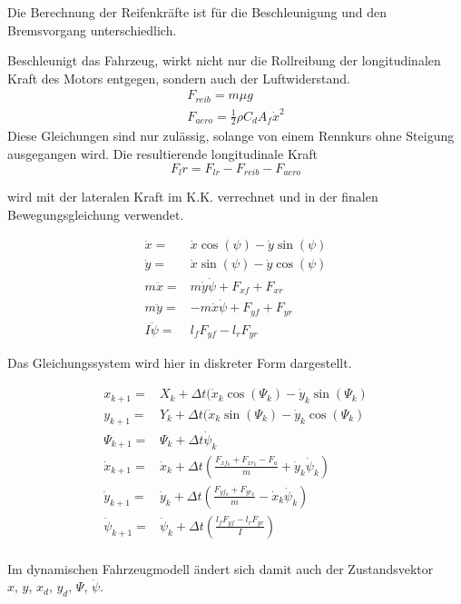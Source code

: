 \documentclass{like}
\begin{document}
Die Berechnung der Reifenkräfte ist für die Beschleunigung und den Bremsvorgang unterschiedlich.

Beschleunigt das Fahrzeug, wirkt nicht nur die Rollreibung der longitudinalen Kraft des Motors entgegen, sondern auch der Luftwiderstand.
\begin{eqnarray}
F_{reib} = m \mu g \\
F_{aero} = \frac{1}{2} \rho C_d A_f \dot{x}^2
\end{eqnarray}
Diese Gleichungen sind nur zulässig, solange von einem Rennkurs ohne Steigung ausgegangen wird. Die resultierende longitudinale Kraft 
\begin{equation}
F_lr = F_{lr} - F_{reib} - F_{aero}
\end{equation}

wird mit der lateralen Kraft im \ac{K.K.} verrechnet und in der finalen Bewegungsgleichung verwendet.

\begin{eqnarray}
\dot{x} =& \dot{x} \cos(\psi) - \dot{y} \sin(\psi) \\
\dot{y} =& \dot{x} \sin(\psi) - \dot{y} \cos(\psi) \\
m \ddot{x} =& m \dot{y} \dot{\psi} + F_{xf} +  F_{xr}\\
m \ddot{y} =& - m \dot{x} \dot{\psi} +  F_{yf} +  F_{yr} \\
I \ddot{\psi} =&  l_f F_{yf} -  l_r F_{yr} 
\end{eqnarray}

Das Gleichungssystem wird hier in diskreter Form dargestellt.

\begin{eqnarray}
x_{k+1} =& X_k + \Delta t(\dot{x}_k \cos(\Psi_k) - \dot{y}_k \sin(\Psi_k) \\
y_{k+1} =& Y_{k} + \Delta t(\dot{x}_k \sin(\Psi_k) - \dot{y}_k \cos(\Psi_k) \\
\Psi_{k+1} =& \Psi_k + \Delta t \dot{\psi}_k \\
\dot{x}_{k+1} =&  \dot{x}_k + \Delta t \left(\frac{F_{xf_k} +  F_{xr_k}- F_a}{m} + \dot{y}_k \dot{\psi}_k \right) \\
\dot{y}_{k+1} =&  \dot{y}_k + \Delta t \left(\frac{ F_{yf_k} +  F_{yr_k}}{m} - \dot{x}_k \dot{\psi}_k \right)  \\
\dot{\psi}_{k+1} =& \dot{\psi}_k + \Delta t \left( \frac{ l_f F_{yf} -  l_r F_{yr}}{I}  \right)\\
\end{eqnarray}

Im dynamischen Fahrzeugmodell ändert sich damit auch der Zustandsvektor \\
\(x\), \(y\), \(x_d\), \(y_d\), \(\Psi\), \(\dot{\psi}\). \\
\end{document}
